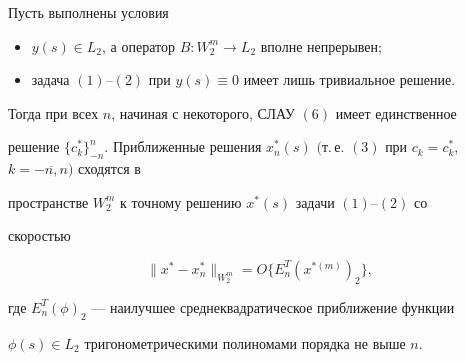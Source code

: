 \begin{thm}


Пусть выполнены условия


\begin{itemize}


\item[а)] $y(s) \in L_2$, а оператор $B:W_2^m \to L_2$ вполне непрерывен$;$


\item[б)] задача $(1)$--$(2)$ при $y(s) \equiv 0$ имеет лишь тривиальное решение.


\end{itemize}





Тогда при всех $n$, начиная с некоторого, СЛАУ $(6)$ имеет единственное


решение $\lbrace c_k^* \rbrace_{-n}^n$. Приближенные решения $x_n^*


(s)$ $($т.\,е. $(3)$ при $c_k=c_k^*$, $k=\overline{-n,n})$ сходятся в


пространстве $W_2^m$ к точному решению $x^*(s)$ задачи $(1)$--$(2)$ со


скоростью


\begin{equation}


\| x^* - x_n^* \|_{W_2^m}=O \lbrace E_n^T(x^{*(m)})_2 \rbrace,


\end{equation}


где $E_n^T( \phi)_2$ --- наилучшее среднеквадратическое приближение функции


$\phi(s) \in L_2$ тригонометрическими полиномами порядка не выше $n$.


\end{thm}








